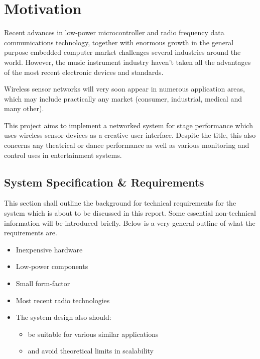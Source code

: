 \section{Motivation}

  Recent advances in low-power microcontroller and radio frequency data communications
 technology, together with enormous growth in the general purpose embedded computer
 market challenges several industries around the world. However, the music instrument
 industry haven't taken all the advantages of the most recent electronic devices
 and standards.
 
 Wireless sensor networks will very soon appear in numerous application areas,
 which may include practically any market (consumer, industrial, medical and many other).
 
 This project aims to implement a networked system for stage performance which uses
 wireless sensor devices as a creative user interface. Despite the title, this also
 concerns any theatrical or dance performance as well as various monitoring and
 control uses in entertainment systems.

\subsection{System Specification \& Requirements}

   This section shall outline the background for technical
 requirements for the system which is about to be discussed
 in this report. Some essential non-technical information
 will be introduced briefly. Below is a very general outline
 of what the requirements are.

  \begin{itemize} \em
	  \item	Inexpensive hardware
	  \item	Low-power components
	  \item	Small form-factor
	  \item	Most recent radio technologies

  \item The system design also should:

  \begin{itemize}
	  \item	be suitable for various similar applications
	  \item	and avoid theoretical limits in scalability 

  \end{itemize}
  \end{itemize}


